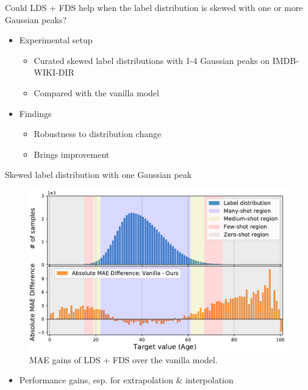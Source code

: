 
\begin{frame}{Could LDS + FDS help when the label distribution is skewed with one or more Gaussian peaks?}
	\begin{itemize}\setlength\itemsep{1.5em}
		\item Experimental setup
		\begin{itemize}
			\item Curated skewed label distributions with 1-4 Gaussian peaks on IMDB-WIKI-DIR
			\item Compared with the vanilla model
		\end{itemize}
		\item Findings
		\begin{itemize}
			\item Robustness to distribution change
			\item Brings improvement
		\end{itemize}
	\end{itemize}
\end{frame}

\begin{frame}{Skewed label distribution with one Gaussian peak}
	\begin{figure}[h]
		\includegraphics[width=0.7\linewidth]{images/interp_extrap_diff_peak1.pdf}
		\caption{MAE gains of LDS + FDS over the vanilla model.}
	\end{figure}
	\begin{itemize}
		\item Performance gains, esp. for extrapolation \& interpolation
	\end{itemize}
\end{frame}

